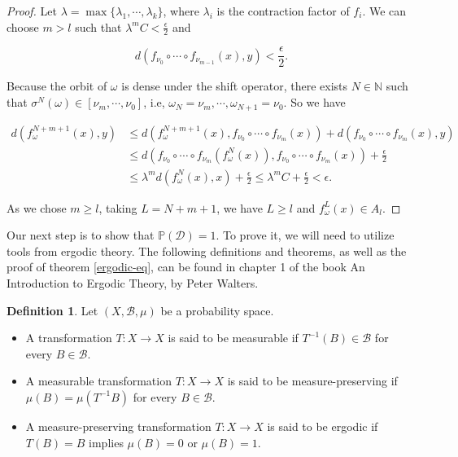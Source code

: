 \documentclass[a4paper]{article}
\theoremstyle{plain}
\theoremstyle{definition}
\newtheorem{defn}[theorem]{Definition}%
\newcommand{\PP}{\mathbb{P}}
\begin{document}
\begin{proof}
    Let $\lambda = \max\{\lambda_1, \cdots, \lambda_k\}$, where $\lambda_i$ is the contraction factor of $f_i$. We can choose $m>l$ such that $\lambda^mC<\frac{\epsilon}{2}$ and
    
    $$d(f_{\nu_0}\circ\cdots\circ f_{\nu_{m-1}}(x), y)<\frac{\epsilon}{2}.$$

    Because the orbit of $\omega$ is dense under the shift operator, there exists $N\in\mathbb N$ such that $\sigma^N(\omega)\in[\nu_m, \cdots, \nu_0]$, i.e, $\omega_N=\nu_m, \cdots, \omega_{N+1}=\nu_0$. So we have

    \begin{align*}
        d(f_\omega^{N+m+1}(x), y) &\leq d(f_\omega^{N+m+1}(x), f_{\nu_0}\circ\cdots\circ f_{\nu_m}(x))+d(f_{\nu_0}\circ\cdots\circ f_{\nu_m}(x), y)\\
        &\leq d(f_{\nu_0}\circ\cdots\circ f_{\nu_m}(f_\omega^N(x)), f_{\nu_0}\circ\cdots\circ f_{\nu_m}(x))+\frac{\epsilon}{2}\\
        &\leq \lambda^m d(f_\omega^N(x), x)+\frac{\epsilon}{2}\leq \lambda^mC+\frac{\epsilon}{2}<\epsilon.
    \end{align*}

    As we chose $m\geq l$, taking $L=N+m+1$, we have $L\geq l$ and $f_\omega^{L}(x)\in A_l$.
\end{proof}

Our next step is to show that $\PP(\mathcal D)=1$. To prove it, we will need to utilize tools from ergodic theory. The following definitions and theorems, as well as the proof of theorem \ref{ergodic-eq}, can be found in chapter 1 of the book An Introduction to Ergodic Theory, by Peter Walters.

\begin{defn}Let $(X, \mathcal B, \mu)$ be a probability space. 
\begin{itemize}
\item A transformation $T:X\to X$ is said to be measurable if $T^{-1}(B)\in\mathcal B$ for every $B\in\mathcal B$.
\item A measurable transformation $T:X\to X$ is said to be measure-preserving if $\mu(B)=\mu(T^{-1}B)$ for every $B\in\mathcal B$.
\item A measure-preserving transformation $T:X\to X$ is said to be ergodic if $T(B)=B$ implies $\mu(B)=0$ or $\mu(B)=1$.
\end{itemize}
\end{defn}
\end{document}
